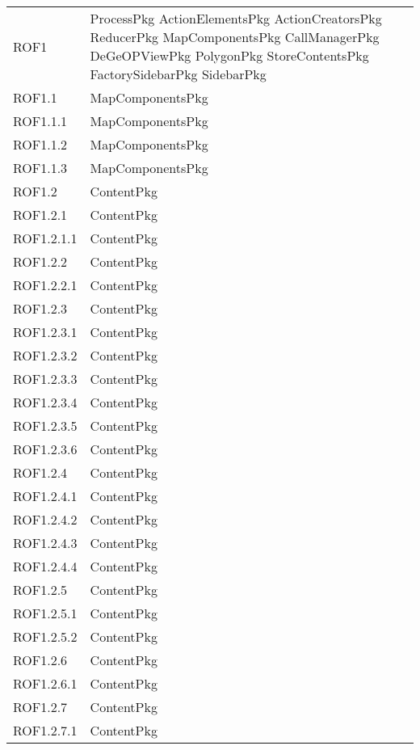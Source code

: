 \begin{longtable}{p{2.5cm}!{\VRule[1pt]}p{5cm}}
		ROF1 & ProcessPkg \newline ActionElementsPkg \newline ActionCreatorsPkg \newline ReducerPkg \newline MapComponentsPkg \newline CallManagerPkg \newline DeGeOPViewPkg \newline PolygonPkg \newline StoreContentsPkg \newline FactorySidebarPkg \newline SidebarPkg\\
		ROF1.1 & MapComponentsPkg\\
		ROF1.1.1 & MapComponentsPkg\\
		ROF1.1.2 & MapComponentsPkg\\
		ROF1.1.3 & MapComponentsPkg\\
		ROF1.2 & ContentPkg\\
		ROF1.2.1 & ContentPkg\\
		ROF1.2.1.1 & ContentPkg\\
		ROF1.2.2 & ContentPkg\\
		ROF1.2.2.1 & ContentPkg\\
		ROF1.2.3 & ContentPkg\\
		ROF1.2.3.1 & ContentPkg\\
		ROF1.2.3.2 & ContentPkg\\
		ROF1.2.3.3 & ContentPkg\\
		ROF1.2.3.4 & ContentPkg\\
		ROF1.2.3.5 & ContentPkg\\
		ROF1.2.3.6 & ContentPkg\\
		ROF1.2.4 & ContentPkg\\
		ROF1.2.4.1 & ContentPkg\\
		ROF1.2.4.2 & ContentPkg\\
		ROF1.2.4.3 & ContentPkg\\
		ROF1.2.4.4 & ContentPkg\\
		ROF1.2.5 & ContentPkg\\
		ROF1.2.5.1 & ContentPkg\\
		ROF1.2.5.2 & ContentPkg\\
		ROF1.2.6 & ContentPkg\\
		ROF1.2.6.1 & ContentPkg\\
		ROF1.2.7 & ContentPkg\\
		ROF1.2.7.1 & ContentPkg\\

\end{longtable}
